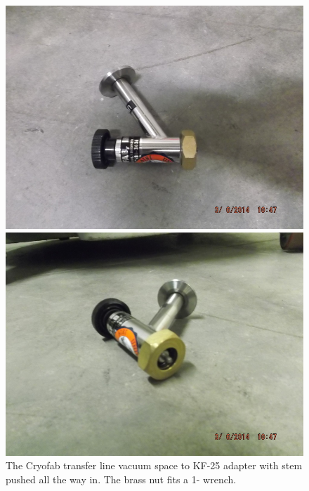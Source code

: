 \begin{figure}[!htbp]
 \centering
 \begin{minipage}{.45\textwidth}
 \includegraphics[width=\textwidth]{./img/cf-adapter.JPG}
 \end{minipage}
 \quad
  \begin{minipage}{.45\textwidth}
 \includegraphics[width=\textwidth]{./img/cf-adapter-angle.JPG}
 \end{minipage}
 \caption{The Cryofab transfer line vacuum space to KF-25 adapter with stem pushed all the way in.  The brass nut fits a 1-\inches{} wrench.}
 \label{fig:cf-adapter}

\end{figure}

